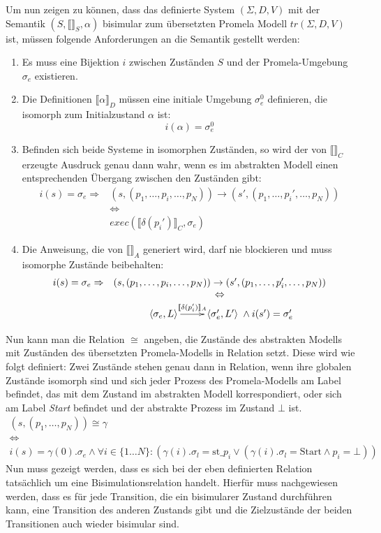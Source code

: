 Um nun zeigen zu können, dass das definierte System $(\Sigma,D,V)$ mit der Semantik $(S,\llbracket \rrbracket_S,\alpha)$ bisimular zum übersetzten Promela Modell $tr(\Sigma,D,V)$ ist, müssen folgende Anforderungen an die Semantik gestellt werden:
\begin{enumerate}
\item Es muss eine Bijektion $i$ zwischen Zuständen $S$ und der Promela-Umgebung $\sigma_e$ existieren.
\item Die Definitionen $\llbracket \alpha \rrbracket_D$ müssen eine initiale Umgebung $\sigma_e^0$ definieren, die isomorph zum Initialzustand $\alpha$ ist: 
  \[ i(\alpha) = \sigma_e^0 \]
\item Befinden sich beide Systeme in isomorphen Zuständen, so wird der von $\llbracket \rrbracket_C$ erzeugte Ausdruck genau dann wahr, wenn es im abstrakten Modell einen entsprechenden Übergang zwischen den Zuständen gibt:
  \[ \begin{array}{rc}
    i(s) = \sigma_e \Rightarrow &
    (s,(p_1,\dots,p_i,\dots,p_N))\rightarrow (s',(p_1,\dots,p_i',\dots,p_N)) \\
    & \Leftrightarrow\\
    & exec(\llbracket \delta(p_i')\rrbracket_C,\sigma_e)
  \end{array} \]
\item Die Anweisung, die von $\llbracket \rrbracket_A$ generiert wird, darf nie blockieren und muss isomorphe Zustände beibehalten:
  \[ \begin{array}{rc}
    i(s) = \sigma_e \Rightarrow &
    (s,(p_1,\dots,p_i,\dots,p_N))\rightarrow (s',(p_1,\dots,p_i',\dots,p_N))\\
    & \Leftrightarrow\\
    & \xymatrix { \left<\sigma_e,L\right> \ar[r]^-{\llbracket \delta(p_i')\rrbracket_A} & \left<\sigma_e',L'\right> } \land i(s') = \sigma_e'
  \end{array} \]
\end{enumerate}
Nun kann man die Relation $\cong$ angeben, die Zustände des abstrakten Modells mit Zuständen des übersetzten Promela-Modells in Relation setzt.
Diese wird wie folgt definiert:
Zwei Zustände stehen genau dann in Relation, wenn ihre globalen Zustände isomorph sind und sich jeder Prozess des Promela-Modells am Label befindet, das mit dem Zustand im abstrakten Modell korrespondiert, oder sich am Label \emph{Start} befindet und der abstrakte Prozess im Zustand $\bot$ ist.
\[
\begin{array}{c}
  (s,(p_1,\dots,p_N))\cong \gamma\\
  \Leftrightarrow\\
  i(s)=\gamma(0).\sigma_e \land \forall i\in\{1\dots N\}: (\gamma(i).\sigma_l = \textrm{st\_}p_i \lor (\gamma(i).\sigma_l = \textrm{Start}\land p_i=\bot))
\end{array}
\]
Nun muss gezeigt werden, dass es sich bei der eben definierten Relation tatsächlich um eine Bisimulationsrelation handelt.
Hierfür muss nachgewiesen werden, dass es für jede Transition, die ein bisimularer Zustand durchführen kann, eine Transition des anderen Zustands gibt und die Zielzustände der beiden Transitionen auch wieder bisimular sind.

